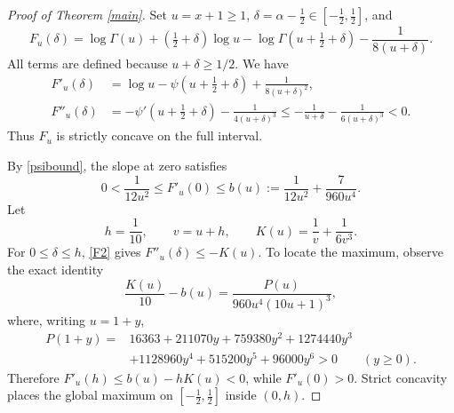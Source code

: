 \documentclass[11pt]{article}
\begin{document}
\begin{proof}[Proof of Theorem \ref{main}]
Set \(u=x+1\geq1\), \(\delta=\alpha-\tfrac12\in[-\tfrac12,\tfrac12]\),
and
\[
 F_u(\delta)=\log\Gamma(u)+(\tfrac12+\delta)\log u
             -\log\Gamma(u+\tfrac12+\delta)-\frac1{8(u+\delta)}.
\]
All terms are defined because \(u+\delta\geq1/2\). We have
\begin{align}
 F'_u(\delta)&=\log u-\psi(u+\tfrac12+\delta)
                       +\frac1{8(u+\delta)^2}, \label{F1}\\
 F''_u(\delta)&=-\psi'(u+\tfrac12+\delta)
                       -\frac1{4(u+\delta)^3}
 \leq-\frac1{u+\delta}-\frac1{6(u+\delta)^3}<0. \label{F2}
\end{align}
Thus \(F_u\) is strictly concave on the full interval.

By \eqref{psibound}, the slope at zero satisfies
\begin{equation}\label{slope}
 0<\frac1{12u^2}\leq F'_u(0)\leq
 b(u):=\frac1{12u^2}+\frac7{960u^4}.
\end{equation}
Let
\[
 h=\frac1{10},\qquad v=u+h,\qquad
 K(u)=\frac1v+\frac1{6v^3}.
\]
For \(0\leq\delta\leq h\), \eqref{F2} gives \(F''_u(\delta)\leq-K(u)\).
To locate the maximum, observe the exact identity
\begin{equation}\label{J}
 \frac{K(u)}{10}-b(u)=\frac{P(u)}{960u^4(10u+1)^3},
\end{equation}
where, writing \(u=1+y\),
\begin{align*}
 P(1+y)={}&16363+211070y+759380y^2+1274440y^3\\
           &+1128960y^4+515200y^5+96000y^6>0
           \qquad(y\geq0).
\end{align*}
Therefore \(F'_u(h)\leq b(u)-hK(u)<0\), while \(F'_u(0)>0\).
Strict concavity places the global maximum on
\([-\tfrac12,\tfrac12]\) inside \((0,h)\).


\end{proof}
\end{document}
